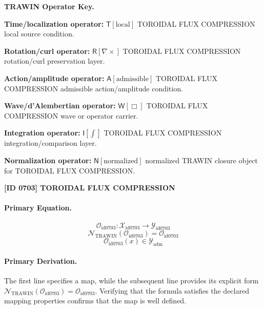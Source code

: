 \par\vspace{0.45\baselineskip}
\noindent\begin{minipage}[t]{\linewidth}
\begingroup
\small
\raggedright
\textbf{TRAWIN Operator Key.}\par
\noindent\textbf{Time/localization operator:} $\mathsf{T}\!\left[\mathrm{local}\right]$ TOROIDAL FLUX COMPRESSION local source condition.\par
\noindent\textbf{Rotation/curl operator:} $\mathsf{R}\!\left[\nabla\times\right]$ TOROIDAL FLUX COMPRESSION rotation/curl preservation layer.\par
\noindent\textbf{Action/amplitude operator:} $\mathsf{A}\!\left[\mathrm{admissible}\right]$ TOROIDAL FLUX COMPRESSION admissible action/amplitude condition.\par
\noindent\textbf{Wave/d'Alembertian operator:} $\mathsf{W}\!\left[\Box\right]$ TOROIDAL FLUX COMPRESSION wave or operator carrier.\par
\noindent\textbf{Integration operator:} $\mathsf{I}\!\left[\int\right]$ TOROIDAL FLUX COMPRESSION integration/comparison layer.\par
\noindent\textbf{Normalization operator:} $\mathsf{N}\!\left[\mathrm{normalized}\right]$ normalized TRAWIN closure object for TOROIDAL FLUX COMPRESSION.\par
\endgroup
\end{minipage}

\clearpage
\noindent\textbf{[ID 0703] TOROIDAL FLUX COMPRESSION}\par
\vspace{0.35em}
\paragraph{Primary Equation.}
\[
\mathcal{O}_{\mathrm{id0703}}:\mathcal{X}_{\mathrm{id0703}}\longrightarrow\mathcal{Y}_{\mathrm{id0703}}
\]
\[
\mathcal{N}_{\mathrm{TRAWIN}}(\mathcal{O}_{\mathrm{id0703}})=\mathcal{O}_{\mathrm{id0703}}
\]
\[
\mathcal{O}_{\mathrm{id0703}}(x)\in\mathcal{Y}_{\mathrm{adm}}
\]

\paragraph{Primary Derivation.}
The first line specifies a map, while the subsequent line provides its explicit form \( \mathcal{N}_{\mathrm{TRAWIN}}(\mathcal{O}_{\mathrm{id0703}})=\mathcal{O}_{\mathrm{id0703}} \). Verifying that the formula satisfies the declared mapping properties confirms that the map is well defined.

